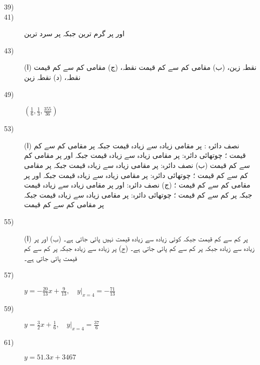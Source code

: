 \begin {description}
\item [
39)
]
\item [
41)
]
  اور  پر گرم ترین  جبکہ  پر سرد ترین  
\item [
43)
]
 (ا)  نقطہ زین، (ب)  مقامی کم سے کم قیمت نقطہ، (ج)  مقامی کم سے کم قیمت نقطہ، (د)  نقطہ زین 
\item [
49)
]
 $(\tfrac {1}{6},\tfrac {1}{3},\tfrac {355}{36})$ 
\item [
53)
]
 (ا) نصف دائرہ :  پر مقامی زیادہ سے زیادہ قیمت  جبکہ  پر مقامی کم سے کم قیمت ؛ چوتھائی دائرہ:  پر مقامی زیادہ سے زیادہ قیمت  جبکہ  اور  پر مقامی کم سے کم قیمت  (ب) نصف دائرہ:  پر مقامی زیادہ سے زیادہ قیمت  جبکہ  پر مقامی کم سے کم قیمت ؛ چوتھائی دائرہ:  پر مقامی زیادہ سے زیادہ قیمت  جبکہ  اور  پر مقامی کم سے کم قیمت ؛ (ج) نصف دائرہ:  اور  پر مقامی زیادہ سے زیادہ قیمت  جبکہ  پر کم سے کم قیمت ؛ چوتھائی دائرہ:  پر مقامی زیادہ سے زیادہ قیمت  جبکہ  پر مقامی کم سے کم قیمت  
\item [
55)
]
 (ا)  پر کم سے کم قیمت  جبکہ کوئی زیادہ سے زیادہ قیمت نہیں پائی جاتی ہے۔ (ب)  اور  پر زیادہ سے زیادہ  جبکہ  پر کم سے کم  پائی جاتی ہے۔ (ج)  پر زیادہ سے زیادہ  جبکہ  پر کم سے کم قیمت  پائی جاتی ہے۔ 
\item [
57)
]
 $y=-\frac {20}{13}x+\frac {9}{13},\quad \left .y\right \vert _{x=4}=-\frac {71}{13}$ 
\item [
59)
]
 $y=\frac {3}{2}x+\frac {1}{6},\quad \left .y\right \vert _{x=4}=\frac {37}{6}$ 
\item [
61)
]
 $y=51.3x+3467$ 
\end {description}
